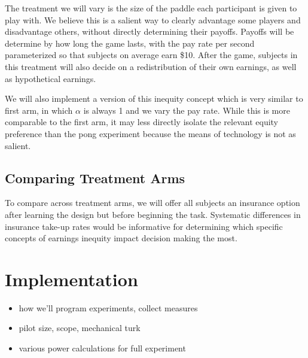 \documentclass[12pt, a4paper]{article}
\begin{document}
The treatment we will vary is the size of the paddle each participant is given to play with. We believe this is a salient way to clearly advantage some players and disadvantage others, without directly determining their payoffs. Payoffs will be determine by how long the game lasts, with the pay rate per second parameterized so that subjects on average earn \$10. After the game, subjects in this treatment will also decide on a redistribution of their own earnings, as well as hypothetical earnings.

We will also implement a version of this inequity concept which is very similar to first arm, in which $\alpha$ is always 1 and we vary the pay rate. While this is more comparable to the first arm, it may less directly isolate the relevant equity preference than the pong experiment because the means of technology is not as salient.

\subsection*{Comparing Treatment Arms}

To compare across treatment arms, we will offer all subjects an insurance option after learning the design but before beginning the task. Systematic differences in insurance take-up rates would be informative for determining which specific concepts of earnings inequity impact decision making the most.
% 
% 


\section*{Implementation}

\begin{itemize}
\item how we'll program experiments, collect measures
\item pilot size, scope, mechanical turk
\item various power calculations for full experiment
\end{itemize}



\end{document}
